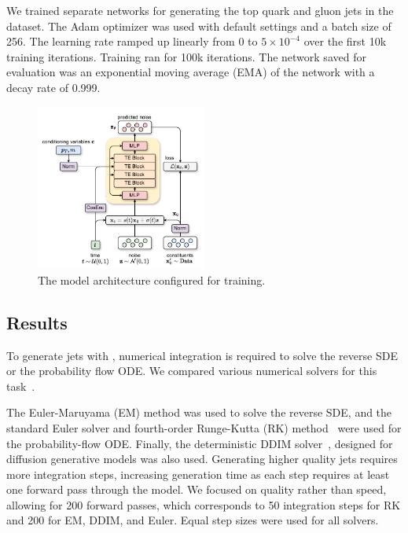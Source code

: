 We trained separate networks for generating the top quark and gluon jets in the dataset.
The Adam optimizer was used with default settings and a batch size of 256.
The learning rate ramped up linearly from 0 to $5 \times 10^{-4}$ over the first 10k training iterations.
Training ran for 100k iterations.
The network saved for evaluation was an exponential moving average (EMA) of the network with a decay rate of 0.999.

\begin{figure}
    \centering
    \includegraphics[width=0.5\textwidth]{Figures/jet_generation/pcjedi.pdf}
    \caption{The \pcjedi model architecture configured for training.}
    \label{fig:pcjedi}
\end{figure}

\subsection{Results}

To generate jets with \pcjedi, numerical integration is required to solve the reverse SDE or the probability flow ODE.
We compared various numerical solvers for this task~\cite{NumericalSolutionStochastic}.

The Euler-Maruyama (EM) method was used to solve the reverse SDE, and the standard Euler solver and fourth-order Runge-Kutta (RK) method~\cite{RungeKutta} were used for the probability-flow ODE.
Finally, the deterministic DDIM solver~\cite{DDIM}, designed for diffusion generative models was also used.
Generating higher quality jets requires more integration steps, increasing generation time as each step requires at least one forward pass through the model.
We focused on quality rather than speed, allowing for 200 forward passes, which corresponds to 50 integration steps for RK and 200 for EM, DDIM, and Euler.
Equal step sizes were used for all solvers.


